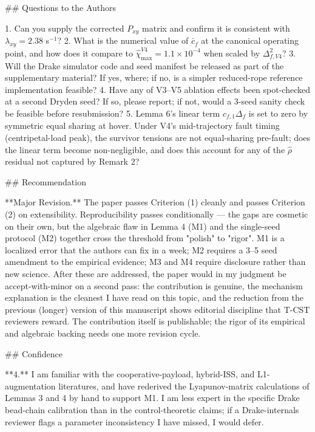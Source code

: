 ## Questions to the Authors

1. Can you supply the corrected $P_{xy}$ matrix and confirm it is consistent with $\lambda_{xy} = 2.38$ s$^{-1}$?
2. What is the numerical value of $\bar c_f$ at the canonical operating point, and how does it compare to $\hat\chi_{\max}^{V4} = 1.1\times 10^{-4}$ when scaled by $\Delta_{f,V4}^2$?
3. Will the Drake simulator code and seed manifest be released as part of the supplementary material? If yes, where; if no, is a simpler reduced-rope reference implementation feasible?
4. Have any of V3–V5 ablation effects been spot-checked at a second Dryden seed? If so, please report; if not, would a 3-seed sanity check be feasible before resubmission?
5. Lemma 6's linear term $c_{f,1} \Delta_f$ is set to zero by symmetric equal sharing at hover. Under V4's mid-trajectory fault timing (centripetal-load peak), the survivor tensions are not equal-sharing pre-fault; does the linear term become non-negligible, and does this account for any of the $\hat\rho$ residual not captured by Remark 2?

## Recommendation

**Major Revision.** The paper passes Criterion (1) cleanly and passes Criterion (2) on extensibility. Reproducibility passes conditionally — the gaps are cosmetic on their own, but the algebraic flaw in Lemma 4 (M1) and the single-seed protocol (M2) together cross the threshold from "polish" to "rigor". M1 is a localized error that the authors can fix in a week; M2 requires a 3–5 seed amendment to the empirical evidence; M3 and M4 require disclosure rather than new science. After these are addressed, the paper would in my judgment be accept-with-minor on a second pass: the contribution is genuine, the mechanism explanation is the cleanest I have read on this topic, and the reduction from the previous (longer) version of this manuscript shows editorial discipline that T-CST reviewers reward. The contribution itself is publishable; the rigor of its empirical and algebraic backing needs one more revision cycle.

## Confidence

**4.** I am familiar with the cooperative-payload, hybrid-ISS, and L1-augmentation literatures, and have rederived the Lyapunov-matrix calculations of Lemmas 3 and 4 by hand to support M1. I am less expert in the specific Drake bead-chain calibration than in the control-theoretic claims; if a Drake-internals reviewer flags a parameter inconsistency I have missed, I would defer.